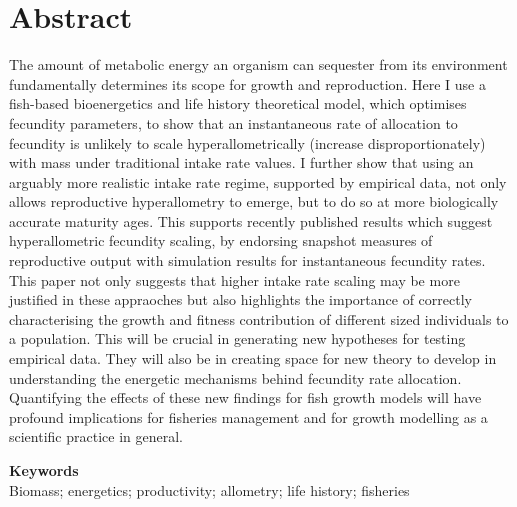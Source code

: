 \documentclass[a4paper]{article} %
\begin{document}
\section*{Abstract}\thispagestyle{plain}
    The amount of metabolic energy an organism can sequester from its environment fundamentally determines its scope for growth and reproduction. Here I use a fish-based bioenergetics and life history theoretical model, which optimises fecundity parameters, to show that an instantaneous rate of allocation to fecundity is unlikely to scale hyperallometrically (increase disproportionately) with mass under traditional intake rate values. I further show that using an arguably more realistic intake rate regime, supported by empirical data, not only allows reproductive hyperallometry to emerge, but to do so at more biologically accurate maturity ages. This supports recently published results which suggest hyperallometric fecundity scaling, by endorsing snapshot measures of reproductive output with simulation results for instantaneous fecundity rates. This paper not only suggests that higher intake rate scaling may be more justified in these appraoches but also highlights the importance of correctly characterising the growth and fitness contribution of different sized individuals to a population. This will be crucial in generating new hypotheses for testing empirical data. They will also be in creating space for new theory to develop in understanding the energetic mechanisms behind fecundity rate allocation. Quantifying the effects of these new findings for fish growth models will have profound implications for fisheries management and for growth modelling as a scientific practice in general.

    \textbf{Keywords} \\
    Biomass; energetics; productivity; allometry; life history; fisheries
\end{document}
